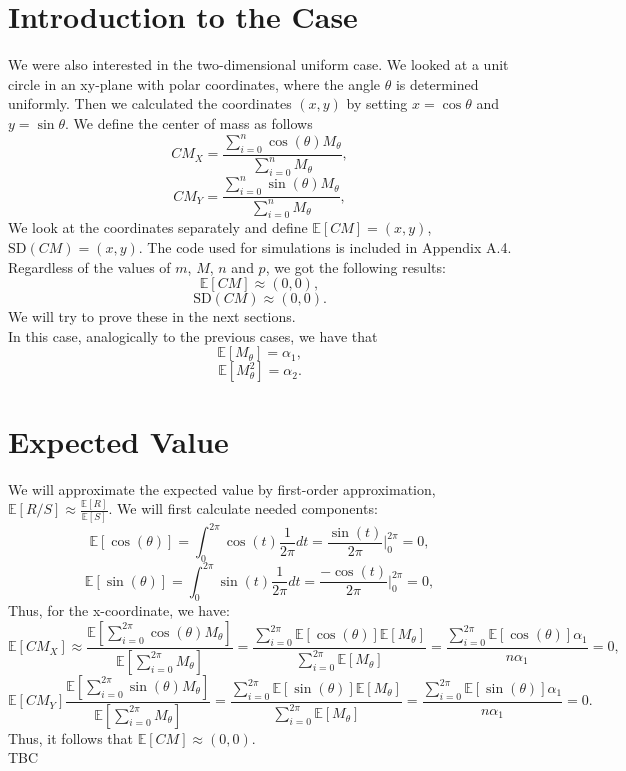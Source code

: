 \documentclass[11pt, twoside, reqno]{book}
\newcommand{\sd}{\text{SD}}
\newcommand{\E}{\mathbb{E}}
\begin{document}
\section{Introduction to the Case}
\label{secC2}

We were also interested in the two-dimensional uniform case. We looked at a unit circle in an xy-plane with polar coordinates, where the angle $\theta$ is determined uniformly. Then we calculated the coordinates $(x,y)$ by setting $x = \cos \theta$ and $y=\sin \theta$. We define the center of mass as follows
$$CM_{X} = \frac{\sum^{n}_{i=0} \cos (\theta)M_{\theta}}{\sum^{n}_{i=0}M_{\theta}},$$
$$CM_{Y}=\frac{\sum^{n}_{i=0} \sin (\theta)M_{\theta}}{\sum^{n}_{i=0}M_{\theta}},$$
We look at the coordinates separately and define $\mathbb{E}[CM]=(x,y)$, $\sd(CM)=(x,y)$. The code used for simulations is included in Appendix A.4. Regardless of the values of $m$, $M$, $n$ and $p$, we got the following results:
$$\mathbb{E}[CM] \approx (0,0),$$
$$\sd(CM) \approx (0,0).$$
We will try to prove these in the next sections.\\
In this case, analogically to the previous cases, we have that
$$\E[M_{\theta}]=\alpha_{1},$$
$$\E[M_{\theta}^{2}]=\alpha_{2}.$$

\section{Expected Value}
\label{secC3}
We will approximate the expected value by first-order approximation, $\mathbb{E}[R/S] \approx \frac{\mathbb{E}[R]}{\mathbb{E}[S]}$. We will first calculate needed components:
$$\mathbb{E}[\cos (\theta)] = \int^{2\pi}_{0}\cos (t) \frac{1}{2\pi} dt = \frac{\sin(t)}{2\pi} \bigg|^{2\pi}_{0}=0,$$
$$\mathbb{E}[\sin (\theta)] = \int^{2\pi}_{0}\sin (t) \frac{1}{2\pi} dt = \frac{-\cos(t)}{2\pi} \bigg|^{2\pi}_{0}=0,$$
Thus, for the x-coordinate, we have:
$$\mathbb{E}[CM_{X}] \approx \frac{\mathbb{E}[\sum^{2\pi}_{i=0} \cos (\theta)M_{\theta}]}{\mathbb{E}[\sum^{2\pi}_{i=0}M_{\theta}]} = \frac{\sum^{2\pi}_{i=0} \mathbb{E}[\cos (\theta)]\mathbb{E}[M_{\theta}]}{\sum^{2\pi}_{i=0}\mathbb{E}[M_{\theta}]}=\frac{\sum^{2\pi}_{i=0}\mathbb{E}[\cos (\theta)] \alpha_{1}}{n\alpha_{1}}=0,$$
$$\mathbb{E}[CM_{Y}]  \frac{\mathbb{E}[\sum^{2\pi}_{i=0} \sin (\theta)M_{\theta}]}{\mathbb{E}[\sum^{2\pi}_{i=0}M_{\theta}]} = \frac{\sum^{2\pi}_{i=0} \mathbb{E}[\sin (\theta)]\mathbb{E}[M_{\theta}]}{\sum^{2\pi}_{i=0}\mathbb{E}[M_{\theta}]}=\frac{\sum^{2\pi}_{i=0}\mathbb{E}[\sin (\theta)] \alpha_{1}}{n\alpha_{1}}=0.$$
Thus, it follows that $\mathbb{E}[CM] \approx (0,0)$.\\
TBC
\end{document}
